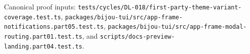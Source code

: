 \begin{itemize}
  Canonical proof inputs: \texttt{t\allowbreak{}e\allowbreak{}s\allowbreak{}t\allowbreak{}s\allowbreak{}/\allowbreak{}c\allowbreak{}y\allowbreak{}c\allowbreak{}l\allowbreak{}e\allowbreak{}s\allowbreak{}/\allowbreak{}D\allowbreak{}L\allowbreak{}-\allowbreak{}0\allowbreak{}1\allowbreak{}8\allowbreak{}/\allowbreak{}f\allowbreak{}i\allowbreak{}r\allowbreak{}s\allowbreak{}t\allowbreak{}-\allowbreak{}p\allowbreak{}a\allowbreak{}r\allowbreak{}t\allowbreak{}y\allowbreak{}-\allowbreak{}t\allowbreak{}h\allowbreak{}e\allowbreak{}m\allowbreak{}e\allowbreak{}-\allowbreak{}v\allowbreak{}a\allowbreak{}r\allowbreak{}i\allowbreak{}a\allowbreak{}n\allowbreak{}t\allowbreak{}-\allowbreak{}c\allowbreak{}o\allowbreak{}v\allowbreak{}e\allowbreak{}r\allowbreak{}a\allowbreak{}g\allowbreak{}e\allowbreak{}.\allowbreak{}t\allowbreak{}e\allowbreak{}s\allowbreak{}t\allowbreak{}.\allowbreak{}t\allowbreak{}s}, \texttt{p\allowbreak{}a\allowbreak{}c\allowbreak{}k\allowbreak{}a\allowbreak{}g\allowbreak{}e\allowbreak{}s\allowbreak{}/\allowbreak{}b\allowbreak{}i\allowbreak{}j\allowbreak{}o\allowbreak{}u\allowbreak{}-\allowbreak{}t\allowbreak{}u\allowbreak{}i\allowbreak{}/\allowbreak{}s\allowbreak{}r\allowbreak{}c\allowbreak{}/\allowbreak{}a\allowbreak{}p\allowbreak{}p\allowbreak{}-\allowbreak{}f\allowbreak{}r\allowbreak{}a\allowbreak{}m\allowbreak{}e\allowbreak{}-\allowbreak{}n\allowbreak{}o\allowbreak{}t\allowbreak{}i\allowbreak{}f\allowbreak{}i\allowbreak{}c\allowbreak{}a\allowbreak{}t\allowbreak{}i\allowbreak{}o\allowbreak{}n\allowbreak{}s\allowbreak{}.\allowbreak{}p\allowbreak{}a\allowbreak{}r\allowbreak{}t\allowbreak{}0\allowbreak{}5\allowbreak{}.\allowbreak{}t\allowbreak{}e\allowbreak{}s\allowbreak{}t\allowbreak{}.\allowbreak{}t\allowbreak{}s}, \texttt{p\allowbreak{}a\allowbreak{}c\allowbreak{}k\allowbreak{}a\allowbreak{}g\allowbreak{}e\allowbreak{}s\allowbreak{}/\allowbreak{}b\allowbreak{}i\allowbreak{}j\allowbreak{}o\allowbreak{}u\allowbreak{}-\allowbreak{}t\allowbreak{}u\allowbreak{}i\allowbreak{}/\allowbreak{}s\allowbreak{}r\allowbreak{}c\allowbreak{}/\allowbreak{}a\allowbreak{}p\allowbreak{}p\allowbreak{}-\allowbreak{}f\allowbreak{}r\allowbreak{}a\allowbreak{}m\allowbreak{}e\allowbreak{}-\allowbreak{}m\allowbreak{}o\allowbreak{}d\allowbreak{}a\allowbreak{}l\allowbreak{}-\allowbreak{}r\allowbreak{}o\allowbreak{}u\allowbreak{}t\allowbreak{}i\allowbreak{}n\allowbreak{}g\allowbreak{}.\allowbreak{}p\allowbreak{}a\allowbreak{}r\allowbreak{}t\allowbreak{}0\allowbreak{}1\allowbreak{}.\allowbreak{}t\allowbreak{}e\allowbreak{}s\allowbreak{}t\allowbreak{}.\allowbreak{}t\allowbreak{}s}, and \texttt{s\allowbreak{}c\allowbreak{}r\allowbreak{}i\allowbreak{}p\allowbreak{}t\allowbreak{}s\allowbreak{}/\allowbreak{}d\allowbreak{}o\allowbreak{}c\allowbreak{}s\allowbreak{}-\allowbreak{}p\allowbreak{}r\allowbreak{}e\allowbreak{}v\allowbreak{}i\allowbreak{}e\allowbreak{}w\allowbreak{}-\allowbreak{}l\allowbreak{}a\allowbreak{}n\allowbreak{}d\allowbreak{}i\allowbreak{}n\allowbreak{}g\allowbreak{}.\allowbreak{}p\allowbreak{}a\allowbreak{}r\allowbreak{}t\allowbreak{}0\allowbreak{}4\allowbreak{}.\allowbreak{}t\allowbreak{}e\allowbreak{}s\allowbreak{}t\allowbreak{}.\allowbreak{}t\allowbreak{}s}.

\end{itemize}
